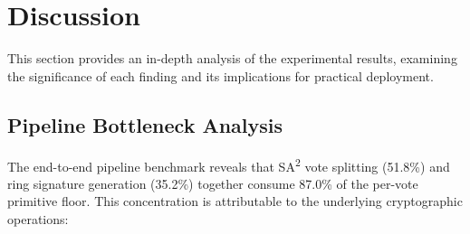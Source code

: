 \section{Discussion}
\label{sec:discussion}

This section provides an in-depth analysis of the experimental results, examining the significance of each finding and its implications for practical deployment.

\subsection{Pipeline Bottleneck Analysis}
\label{subsec:bottleneck}

The end-to-end pipeline benchmark reveals that SA\textsuperscript{2} vote splitting (51.8\%) and ring signature generation (35.2\%) together consume 87.0\% of the per-vote primitive floor. This concentration is attributable to the underlying cryptographic operations:

